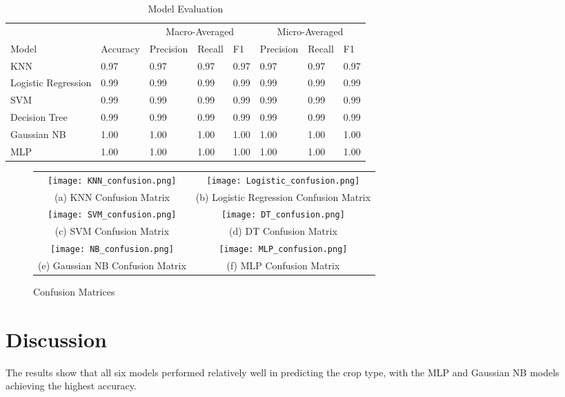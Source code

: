 \documentclass{article}
\begin{document}
\begin{table}[h]
  \caption{Model Evaluation}
  \label{Model Evaluation}
  \centering
  \begin{tabular}{llllllll}
  \toprule
  {} & {} &  \multicolumn{3}{c}{Macro-Averaged} & \multicolumn{3}{c}{Micro-Averaged}\\
  \cmidrule(r){3-5}
  \cmidrule(r){6-8}
    Model & Accuracy & Precision & Recall & F1 & Precision & Recall & F1 \\
    \midrule
    KNN & 0.97  & 0.97 & 0.97 & 0.97 & 0.97 & 0.97 & 0.97 \\
    Logistic Regression & 0.99 & 0.99 & 0.99 & 0.99 & 0.99 & 0.99 & 0.99      \\
    SVM & 0.99 & 0.99 & 0.99 & 0.99 & 0.99 & 0.99 & 0.99       \\
    Decision Tree & 0.99 & 0.99 & 0.99 & 0.99 & 0.99 & 0.99 & 0.99 \\
    Gaussian NB & 1.00 & 1.00 & 1.00 & 1.00 & 1.00 & 1.00 & 1.00  \\
    MLP & 1.00 & 1.00 & 1.00 & 1.00 & 1.00 & 1.00 & 1.00 \\
    \bottomrule
  \end{tabular}
\end{table}

\begin{figure}[h]
\begin{tabular}{cc}
  \texttt{[image: KNN\_confusion.png]} &  \texttt{[image: Logistic\_confusion.png]} \\
(a) KNN Confusion Matrix & (b) Logistic Regression Confusion Matrix \\[6pt]
 \texttt{[image: SVM\_confusion.png]} &   \texttt{[image: DT\_confusion.png]} \\
(c) SVM Confusion Matrix & (d) DT Confusion Matrix \\[6pt]
\texttt{[image: NB\_confusion.png]} &   \texttt{[image: MLP\_confusion.png]} \\
(e) Gaussian NB Confusion Matrix & (f) MLP Confusion Matrix \\[6pt]
\end{tabular}
\caption{Confusion Matrices}
\end{figure}

\section{Discussion}

The results show that all six models performed relatively well in predicting the crop type, with the MLP and Gaussian NB models achieving the highest accuracy.
\end{document}
